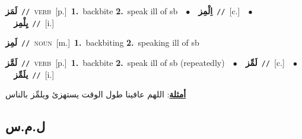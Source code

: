 \documentclass[10pt,a4paper,twoside]{article} %
\begin{document}
\begin{multicols}{2}
{\setlength\topsep{0pt}\textbf{\foreignlanguage{arabic}{لَمَز}}\ {\color{gray}\texttt{//}\color{black}}\ \textsc{verb}\ [p.]\ \textbf{1.}~backbite  \textbf{2.}~speak ill of sb\ \ $\bullet$\ \ \setlength\topsep{0pt}\textbf{\foreignlanguage{arabic}{اِلْمِز}}\ {\color{gray}\texttt{//}\color{black}}\ [c.]\ \ $\bullet$\ \ \setlength\topsep{0pt}\textbf{\foreignlanguage{arabic}{يِلْمِز}}\ {\color{gray}\texttt{//}\color{black}}\ [i.]\ } \vspace{2mm}

{\setlength\topsep{0pt}\textbf{\foreignlanguage{arabic}{لَمِز}}\ {\color{gray}\texttt{//}\color{black}}\ \textsc{noun}\ [m.]\ \textbf{1.}~backbiting  \textbf{2.}~speaking ill of sb\ } \vspace{2mm}

{\setlength\topsep{0pt}\textbf{\foreignlanguage{arabic}{لَمَّز}}\ {\color{gray}\texttt{//}\color{black}}\ \textsc{verb}\ [p.]\ \textbf{1.}~backbite  \textbf{2.}~speak ill of sb (repeatedly)\ \ $\bullet$\ \ \setlength\topsep{0pt}\textbf{\foreignlanguage{arabic}{لَمِّز}}\ {\color{gray}\texttt{//}\color{black}}\ [c.]\ \ $\bullet$\ \ \setlength\topsep{0pt}\textbf{\foreignlanguage{arabic}{يلَمِّز}}\ {\color{gray}\texttt{//}\color{black}}\ [i.]\  \begin{flushright}\color{gray}\foreignlanguage{arabic}{\textbf{\underline{\foreignlanguage{arabic}{أمثلة}}}: اللهم عافينا طول الوقت يستهزئ ويلمِّز بالناس}\end{flushright}\color{black}} \vspace{2mm}

\vspace{-3mm}
\subsection*{\color{blue}\foreignlanguage{arabic}{ل.م.س}\color{blue}{}} 


\end{multicols}
\end{document}
